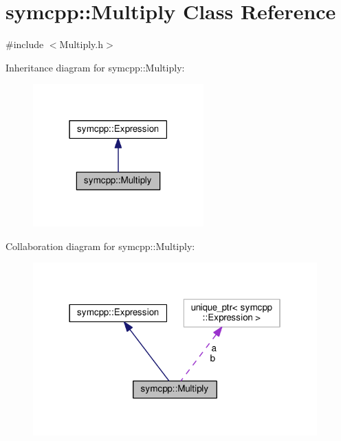 \hypertarget{classsymcpp_1_1Multiply}{}\section{symcpp\+:\+:Multiply Class Reference}
\label{classsymcpp_1_1Multiply}


{\ttfamily \#include $<$Multiply.\+h$>$}



Inheritance diagram for symcpp\+:\+:Multiply\+:\nopagebreak
\begin{figure}[H]
\begin{center}
\leavevmode
\includegraphics[width=186pt]{classsymcpp_1_1Multiply__inherit__graph}
\end{center}
\end{figure}


Collaboration diagram for symcpp\+:\+:Multiply\+:\nopagebreak
\begin{figure}[H]
\begin{center}
\leavevmode
\includegraphics[width=310pt]{classsymcpp_1_1Multiply__coll__graph}
\end{center}
\end{figure}

